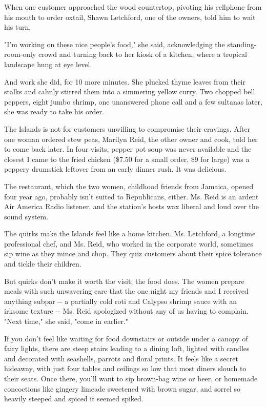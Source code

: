 When one customer approached the wood countertop, pivoting his cellphone
from his mouth to order oxtail, Shawn Letchford, one of the owners, told
him to wait his turn.

"I'm working on these nice people's food," she said, acknowledging the
standing-room-only crowd and turning back to her kiosk of a kitchen,
where a tropical landscape hung at eye level.

And work she did, for 10 more minutes. She plucked thyme leaves from
their stalks and calmly stirred them into a simmering yellow curry. Two
chopped bell peppers, eight jumbo shrimp, one unanswered phone call and
a few sultanas later, she was ready to take his order.

The Islands is not for customers unwilling to compromise their cravings.
After one woman ordered stew peas, Marilyn Reid, the other owner and
cook, told her to come back later. In four visits, pepper pot soup was
never available and the closest I came to the fried chicken (\$7.50 for
a small order, \$9 for large) was a peppery drumstick leftover from an
early dinner rush. It was delicious.

The restaurant, which the two women, childhood friends from Jamaica,
opened four year ago, probably isn't suited to Republicans, either. Ms.
Reid is an ardent Air America Radio listener, and the station's hosts
wax liberal and loud over the sound system.

The quirks make the Islands feel like a home kitchen. Ms. Letchford, a
longtime professional chef, and Ms. Reid, who worked in the corporate
world, sometimes sip wine as they mince and chop. They quiz customers
about their spice tolerance and tickle their children.

But quirks don't make it worth the visit; the food does. The women
prepare meals with such unwavering care that the one night my friends
and I received anything subpar -\/- a partially cold roti and Calypso
shrimp sauce with an irksome texture -\/- Ms. Reid apologized without
any of us having to complain. "Next time," she said, "come in earlier."

If you don't feel like waiting for food downstairs or outside under a
canopy of fairy lights, there are steep stairs leading to a dining loft,
lighted with candles and decorated with seashells, parrots and floral
prints. It feels like a secret hideaway, with just four tables and
ceilings so low that most diners slouch to their seats. Once there,
you'll want to sip brown-bag wine or beer, or homemade concoctions like
gingery limeade sweetened with brown sugar, and sorrel so heavily
steeped and spiced it seemed spiked.

